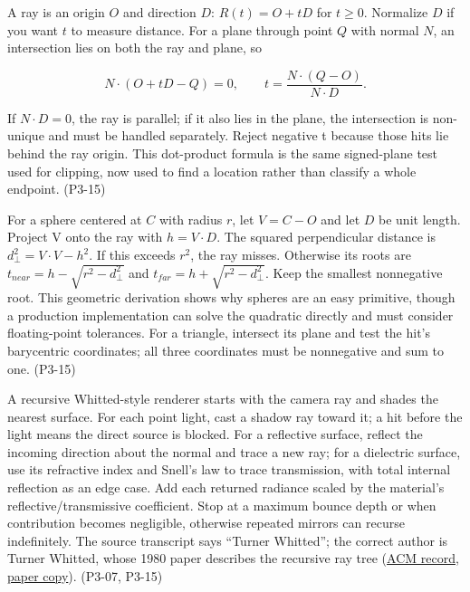 \hypertarget{04-visual-computing-ii-ch029-ray-intersection-recursive-paths-and-acceleration}{}

A ray is an origin \(O\) and direction \(D\): \(R(t)=O+tD\) for \(t\ge0\). Normalize \(D\) if you want \(t\) to measure distance. For a plane through point \(Q\) with normal \(N\), an intersection lies on both the ray and plane, so

\[
N\cdot(O+tD-Q)=0,\qquad t=\frac{N\cdot(Q-O)}{N\cdot D}.
\]

If \(N\cdot D=0\), the ray is parallel; if it also lies in the plane, the intersection is non-unique and must be handled separately. Reject negative t because those hits lie behind the ray origin. This dot-product formula is the same signed-plane test used for clipping, now used to find a location rather than classify a whole endpoint. (P3-15)

For a sphere centered at \(C\) with radius \(r\), let \(V=C-O\) and let \(D\) be unit length. Project V onto the ray with \(h=V\cdot D\). The squared perpendicular distance is \(d_\perp^2=V\cdot V-h^2\). If this exceeds \(r^2\), the ray misses. Otherwise its roots are \(t_{near}=h-\sqrt{r^2-d_\perp^2}\) and \(t_{far}=h+\sqrt{r^2-d_\perp^2}\). Keep the smallest nonnegative root. This geometric derivation shows why spheres are an easy primitive, though a production implementation can solve the quadratic directly and must consider floating-point tolerances. For a triangle, intersect its plane and test the hit's barycentric coordinates; all three coordinates must be nonnegative and sum to one. (P3-15)

A recursive Whitted-style renderer starts with the camera ray and shades the nearest surface. For each point light, cast a shadow ray toward it; a hit before the light means the direct source is blocked. For a reflective surface, reflect the incoming direction about the normal and trace a new ray; for a dielectric surface, use its refractive index and Snell's law to trace transmission, with total internal reflection as an edge case. Add each returned radiance scaled by the material's reflective/transmissive coefficient. Stop at a maximum bounce depth or when contribution becomes negligible, otherwise repeated mirrors can recurse indefinitely. The source transcript says ``Turner Whitted''; the correct author is Turner Whitted, whose 1980 paper describes the recursive ray tree (\href{https://doi.org/10.1145/358876.358882}{ACM record}, \href{https://my.eng.utah.edu/~cs6958/papers/p343-whitted.pdf}{paper copy}). (P3-07, P3-15)

